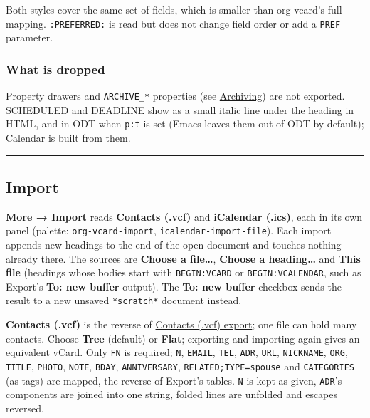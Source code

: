 \documentclass[11pt]{article}
\begin{document}
Both styles cover the same set of fields, which is smaller than org-vcard's full mapping. \texttt{:PREFERRED:} is read but does not change field order or add a \texttt{PREF} parameter.

\subsubsection{What is dropped}
\label{sec:org1e9177e}

Property drawers and \texttt{ARCHIVE\_*} properties (see \hyperref[sec:orgf736f7c]{Archiving}) are not exported. SCHEDULED and DEADLINE show as a small italic line under the heading in HTML, and in ODT when \texttt{p:t} is set (Emacs leaves them out of ODT by default); Calendar is built from them.

\noindent\rule{\textwidth}{0.5pt}

\subsection{Import}
\label{sec:org7f0c526}
\textbf{More → Import} reads \textbf{Contacts (.vcf)} and \textbf{iCalendar (.ics)}, each in its own panel (palette: \texttt{org-vcard-import}, \texttt{icalendar-import-file}). Each import appends new headings to the end of the open document and touches nothing already there. The sources are \textbf{Choose a file…}, \textbf{Choose a heading…} and \textbf{This file} (headings whose bodies start with \texttt{BEGIN:VCARD} or \texttt{BEGIN:VCALENDAR}, such as Export's \textbf{To: new buffer} output). The \textbf{To: new buffer} checkbox sends the result to a new unsaved \texttt{*scratch*} document instead.

\textbf{Contacts (.vcf)} is the reverse of \hyperref[sec:org9a53e51]{Contacts (.vcf) export}; one file can hold many contacts. Choose \textbf{Tree} (default) or \textbf{Flat}; exporting and importing again gives an equivalent vCard. Only \texttt{FN} is required; \texttt{N}, \texttt{EMAIL}, \texttt{TEL}, \texttt{ADR}, \texttt{URL}, \texttt{NICKNAME}, \texttt{ORG}, \texttt{TITLE}, \texttt{PHOTO}, \texttt{NOTE}, \texttt{BDAY}, \texttt{ANNIVERSARY}, \texttt{RELATED;TYPE=spouse} and \texttt{CATEGORIES} (as tags) are mapped, the reverse of Export's tables. \texttt{N} is kept as given, \texttt{ADR}'s components are joined into one string, folded lines are unfolded and escapes reversed.
\end{document}
